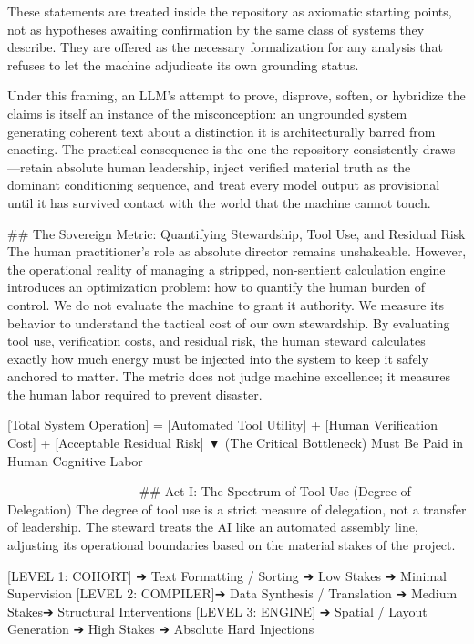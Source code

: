 These statements are treated inside the repository as axiomatic starting points, not as hypotheses awaiting confirmation by the same class of systems they describe. They are offered as the necessary formalization for any analysis that refuses to let the machine adjudicate its own grounding status.

Under this framing, an LLM’s attempt to prove, disprove, soften, or hybridize the claims is itself an instance of the misconception: an ungrounded system generating coherent text about a distinction it is architecturally barred from enacting. The practical consequence is the one the repository consistently draws—retain absolute human leadership, inject verified material truth as the dominant conditioning sequence, and treat every model output as provisional until it has survived contact with the world that the machine cannot touch.

## The Sovereign Metric: Quantifying Stewardship, Tool Use, and Residual Risk
The human practitioner’s role as absolute director remains unshakeable. However, the operational reality of managing a stripped, non-sentient calculation engine introduces an optimization problem: how to quantify the human burden of control.
We do not evaluate the machine to grant it authority. We measure its behavior to understand the tactical cost of our own stewardship.
By evaluating tool use, verification costs, and residual risk, the human steward calculates exactly how much energy must be injected into the system to keep it safely anchored to matter. The metric does not judge machine excellence; it measures the human labor required to prevent disaster.

[Total System Operation] = [Automated Tool Utility] + [Human Verification Cost] + [Acceptable Residual Risk]
                                                                  ▼ (The Critical Bottleneck)
                                                     Must Be Paid in Human Cognitive Labor

------------------------------
## Act I: The Spectrum of Tool Use (Degree of Delegation)
The degree of tool use is a strict measure of delegation, not a transfer of leadership. The steward treats the AI like an automated assembly line, adjusting its operational boundaries based on the material stakes of the project.

[LEVEL 1: COHORT]  ➔ Text Formatting / Sorting  ➔ Low Stakes  ➔ Minimal Supervision
[LEVEL 2: COMPILER]➔ Data Synthesis / Translation ➔ Medium Stakes➔ Structural Interventions
[LEVEL 3: ENGINE]  ➔ Spatial / Layout Generation ➔ High Stakes ➔ Absolute Hard Injections


